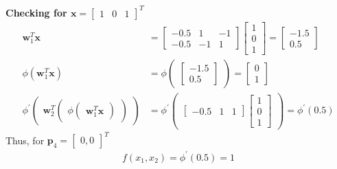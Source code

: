 \textbf{Checking for $\textbf{x} = \begin{bmatrix} 1 & 0 & 1 \end{bmatrix}^T$}
\begin{align*}
  \textbf{w}_1^T\textbf{x} &= \begin{bmatrix}
    -0.5 & 1 & -1 \\
    -0.5 & -1 & 1 
  \end{bmatrix} \begin{bmatrix}
    1\\
    0 \\
    1
  \end{bmatrix} = \begin{bmatrix}
    -1.5 \\
    0.5
  \end{bmatrix} \\
  \phi(\textbf{w}_1^T\textbf{x}) &= \phi\begin{pmatrix}
    \begin{bmatrix}
      -1.5 \\
      0.5
    \end{bmatrix}
  \end{pmatrix} = \begin{bmatrix}
    0 \\
    1
  \end{bmatrix} \\
  \phi^{'} \begin{pmatrix}
    \textbf{w}_2^T 
    \begin{pmatrix}
      \phi \begin{pmatrix}
        \textbf{w}_1^T\textbf{x}
    \end{pmatrix}  
  \end{pmatrix}
  \end{pmatrix} &= \phi^{'}\begin{pmatrix}
    \begin{bmatrix}
      -0.5 & 1 & 1
    \end{bmatrix} \begin{bmatrix}
      1 \\ 
      0 \\
      1
    \end{bmatrix}
  \end{pmatrix} = \phi^{'}(0.5)
\end{align*}
Thus, for $\textbf{p}_4 = \begin{bmatrix}
  0,0
\end{bmatrix}^T$
\begin{align*}
  f(x_1,x_2) = \phi^{'} (0.5) = 1
\end{align*}
